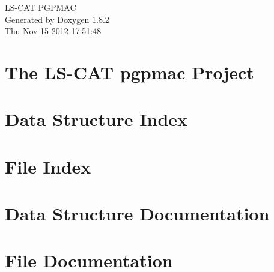 \documentclass{book}
\begin{document}
\hypersetup{pageanchor=false,citecolor=blue}
\begin{titlepage}
\vspace*{7cm}
\begin{center}
{\Large L\-S-\/\-C\-A\-T P\-G\-P\-M\-A\-C }\\
\vspace*{1cm}
{\large Generated by Doxygen 1.8.2}\\
\vspace*{0.5cm}
{\small Thu Nov 15 2012 17:51:48}\\
\end{center}
\end{titlepage}
\clearemptydoublepage
{}
\tableofcontents
\clearemptydoublepage
{}
\hypersetup{pageanchor=true,citecolor=blue}
\chapter{The L\-S-\/\-C\-A\-T pgpmac Project}
\label{index}\hypertarget{index}{}
\chapter{Data Structure Index}

\chapter{File Index}

\chapter{Data Structure Documentation}

















\chapter{File Documentation}










\printindex
\end{document}
